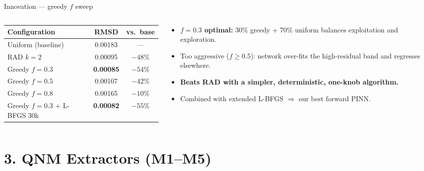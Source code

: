 \documentclass[aspectratio=169, 11pt]{beamer}
\begin{document}
\begin{frame}{Innovation --- greedy $f$ sweep}
  \begin{columns}[T]
    \begin{column}{0.50\textwidth}
      \centering\footnotesize
      \begin{tabular}{@{}lcc@{}}
        \toprule
        \textbf{Configuration} & \textbf{RMSD} & \textbf{vs.\ base} \\
        \midrule
        Uniform (baseline)  & 0.00183 & --- \\
        RAD $k\!=\!2$       & 0.00095 & $-48\%$ \\
        \midrule
        Greedy $f\!=\!0.3$  & \textbf{0.00085} & \textbf{$-54\%$} \\
        Greedy $f\!=\!0.5$  & 0.00107 & $-42\%$ \\
        Greedy $f\!=\!0.8$  & 0.00165 & $-10\%$ \\
        \rowcolor{green!10}
        Greedy $f\!=\!0.3$ + L-BFGS 30k & \textbf{0.00082} & \textbf{$-55\%$} \\
        \bottomrule
      \end{tabular}
    \end{column}
    \begin{column}{0.48\textwidth}
      \begin{itemize}\small
        \item \textbf{$f\!=\!0.3$ optimal:} 30\% greedy + 70\% uniform balances
              exploitation and exploration.
        \item Too aggressive ($f\!\ge\!0.5$): network over-fits the high-residual
              band and regresses elsewhere.
        \item \textbf{Beats RAD with a simpler, deterministic, one-knob algorithm.}
        \item Combined with extended L-BFGS $\Rightarrow$ our best forward PINN.
      \end{itemize}
    \end{column}
  \end{columns}
\end{frame}


\section{3. QNM Extractors (M1--M5)}
\end{document}

